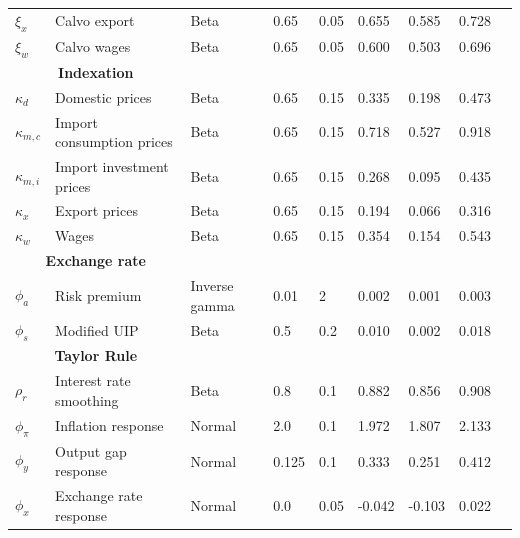 \documentclass[12pt,oneside,a4paper]{article}
\begin{document}
\begin{table}[H]
\begin{tabular}{lllllllll}
$\xi_x$            & Calvo export                           & Beta            & 0.65    & 0.05   &  0.655  & 0.585    & 0.728 \\
$\xi_w$            & Calvo wages                            & Beta            & 0.65    & 0.05   &  0.600  & 0.503    & 0.696 \\
\multicolumn{2}{c}{\textbf{Indexation}}                  &                 &         &        & &         &           &        \\
$\kappa_d$         & Domestic prices                        & Beta            & 0.65    & 0.15   &  0.335   & 0.198     & 0.473  \\
$\kappa_{m,c}$        & Import consumption prices              & Beta            & 0.65    & 0.15   &  0.718   & 0.527     & 0.918  \\
$\kappa_{m,i}$        & Import investment prices               & Beta            & 0.65    & 0.15   &  0.268   & 0.095     & 0.435  \\
$\kappa_x$         & Export prices                          & Beta            & 0.65    & 0.15   &  0.194   & 0.066     & 0.316  \\
$\kappa_w$         & Wages                                  & Beta            & 0.65    & 0.15   &  0.354   & 0.154     & 0.543  \\
\multicolumn{2}{c}{\textbf{Exchange rate}}               &                 &         &        &          &           &        \\
$\phi_a$           & Risk premium                           & Inverse gamma   & 0.01    & 2      &  0.002   & 0.001     & 0.003  \\
$\phi_s$           & Modified UIP                           & Beta            & 0.5     & 0.2    &  0.010   & 0.002     & 0.018  \\
\multicolumn{2}{c}{\textbf{Taylor Rule}}                 &                 &         &        &         &           &        \\
$\rho_r$           & Interest rate smoothing                & Beta            & 0.8     & 0.1    &  0.882  & 0.856     & 0.908  \\
$\phi_{\pi}$          & Inflation response                     & Normal          & 2.0     & 0.1    &  1.972  & 1.807    & 2.133 \\
$\phi_{y}$           & Output gap response                    & Normal          & 0.125   & 0.1    &  0.333   & 0.251    & 0.412  \\
$\phi_{x}$           & Exchange rate response                 & Normal          & 0.0     & 0.05   &  -0.042 & -0.103    & 0.022  \\
\hline
\end{tabular}
\end{table}
\end{document}
